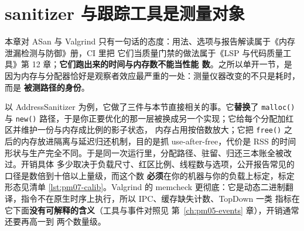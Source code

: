\documentclass[12pt,a4paper,fontset=fandol]{ctexbook}
\newcommand{\Fn}[1]{\texttt{#1()}}
\newcommand{\Mx}[1]{\textsf{#1}}
\begin{document}
\section{sanitizer 与跟踪工具是测量对象}
\label{sec:pm07-sanitizer}

本章对 ASan 与 Valgrind 只有一句话的态度：用法、选项与报告解读属于《内存泄漏检测与防御》册，CI 里把
它们当质量门禁的做法属于《LSP 与代码质量工具》第 12 章；\textbf{它们跑出来的时间与内存数不能当性能
数}。之所以单开一节，是因为内存与分配器恰好是观察者效应最严重的一处：测量仪器改变的不只是耗时，而是
\textbf{被测路径的身份}。

以 AddressSanitizer 为例，它做了三件与本节直接相关的事。它\textbf{替换}了 \Fn{malloc} 与 \Fn{new}
路径，于是你正要优化的那一层被换成另一个实现；它给每个分配加红区并维护一份与内存成比例的影子状态，
内存占用按倍数放大；它把 \Fn{free} 之后的内存放进隔离与延迟归还机制，目的是抓 use-after-free，代价是
\Mx{RSS} 的时间形状与生产完全不同。于是同一次运行里，分配路径、驻留、归还三本账全被改过。开销具体
多少取决于负载尺寸、红区比例、线程数与选项，公开报告常见的口径是数倍到十倍以上量级，而这个数
\textbf{必须}在你的机器与你的负载上标定，标定形态见清单 \ref{lst:pm07-calib}。Valgrind 的 memcheck
更彻底：它是动态二进制翻译，指令不在原生时序上执行，所以 \Mx{IPC}、缓存缺失计数、\Mx{TopDown} 一类
指标在它下面\textbf{没有可解释的含义}（工具与事件对照见 第~\ref{ch:pm05-events} 章），开销通常还要再高一到
两个数量级。
\end{document}
